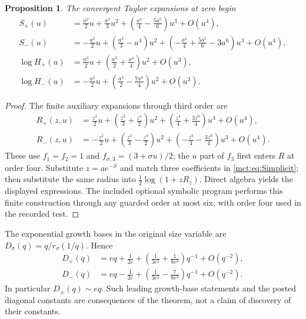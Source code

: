 \documentclass[11pt]{article}
\newtheorem{proposition}[theorem]{Proposition}
\theoremstyle{definition}
\begin{document}
\begin{proposition}\label{mct:prop:jets}
The convergent Taylor expansions at zero begin
\begin{align}
 S_+(u)&=\frac{a^2}{2}u+\frac{a^3}{3}u^2
       +\left(\frac{a^4}{4}-\frac{5a^5}{6}\right)u^3+O(u^4),\label{mct:eq:Splus}\\
 S_-(u)&=-\frac{a^2}{2}u+\left(\frac{a^3}{3}-a^4\right)u^2
       +\left(-\frac{a^4}{4}+\frac{5a^5}{6}-3a^6\right)u^3+O(u^4),\label{mct:eq:Sminus}\\
 \log H_+(u)&=\frac{a^2}{2}u+\left(\frac{a^3}{2}+\frac{a^4}{4}\right)u^2+O(u^3),\\
 \log H_-(u)&=-\frac{a^2}{2}u+\left(\frac{a^3}{2}-\frac{7a^4}{4}\right)u^2+O(u^3).
\end{align}
\end{proposition}
\begin{proof}
The finite auxiliary expansions through third order are
\begin{align*}
 R_+(z,u)&=\frac{z^2}2u+\left(\frac{z^3}3+\frac{z^4}2\right)u^2
 +\left(\frac{z^4}4+\frac{3z^6}4\right)u^3+O(u^4),\\
 R_-(z,u)&=-\frac{z^2}2u+\left(\frac{z^3}3-\frac{z^4}2\right)u^2
 +\left(-\frac{z^4}4-\frac{3z^6}4\right)u^3+O(u^4).
\end{align*}
These use $f_1=f_2=1$ and $f_{\sigma,3}=(3+\sigma u)/2$; the $u$ part of $f_3$ first enters $R$ at order four. Substitute $z=ae^{-S}$ and match three coefficients in \eqref{mct:eq:Simplicit}; then substitute the same radius into $\frac12\log(1+zR_z)$. Direct algebra yields the displayed expressions. The included optional symbolic program performs this finite construction through any guarded order at most six, with order four used in the recorded test.
\end{proof}

The exponential growth bases in the original size variable are $D_\sigma(q)=q/r_\sigma(1/q)$. Hence
\begin{align}
 D_+(q)&=eq+\frac1{2e}+\left(\frac1{3e^2}+\frac1{8e^3}\right)q^{-1}+O(q^{-2}),\\
 D_-(q)&=eq-\frac1{2e}+\left(\frac1{3e^2}-\frac7{8e^3}\right)q^{-1}+O(q^{-2}).
\end{align}
In particular $D_\pm(q)\sim eq$. Such leading growth-base statements and the posted diagonal constants are consequences of the theorem, not a claim of discovery of their constants.
\end{document}
